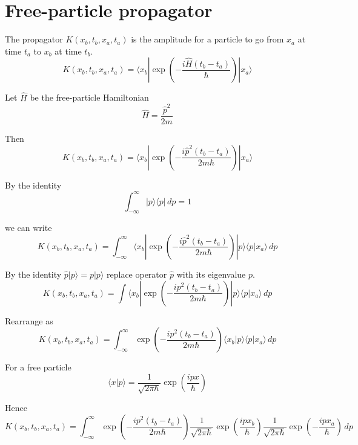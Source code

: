 

\section*{Free-particle propagator}

The propagator $K(x_b,t_b,x_a,t_a)$ is the amplitude for a particle to go from $x_a$
at time $t_a$ to $x_b$ at time $t_b$.
\begin{equation*}
K(x_b,t_b,x_a,t_a)=\langle x_b|\exp\left(-\frac{i\hat H(t_b-t_a)}{\hbar}\right)|x_a\rangle
\end{equation*}

Let $\hat H$ be the free-particle Hamiltonian
\begin{equation*}
\hat H=\frac{\hat p^2}{2m}
\end{equation*}

Then
\begin{equation*}
K(x_b,t_b,x_a,t_a)=\langle x_b|\exp\left(-\frac{i\hat p^2(t_b-t_a)}{2m\hbar}\right)|x_a\rangle
\end{equation*}

By the identity
\begin{equation*}
\int_{-\infty}^\infty|p\rangle\langle p|\,dp=1
\end{equation*}

we can write
\begin{equation*}
K(x_b,t_b,x_a,t_a)=\int_{-\infty}^\infty
\langle x_b|\exp\left(-\frac{i\hat p^2(t_b-t_a)}{2m\hbar}\right)|p\rangle\langle p|x_a\rangle\,dp
\end{equation*}

By the identity $\hat p|p\rangle=p|p\rangle$ replace operator $\hat p$ with its eigenvalue $p$.
\begin{equation*}
K(x_b,t_b,x_a,t_a)=\int\langle x_b|\exp\left(-\frac{ip^2(t_b-t_a)}{2m\hbar}\right)|p\rangle\langle p|x_a\rangle\,dp
\end{equation*}

Rearrange as
\begin{equation*}
K(x_b,t_b,x_a,t_a)=\int_{-\infty}^\infty
\exp\left(-\frac{ip^2(t_b-t_a)}{2m\hbar}\right)\langle x_b|p\rangle\langle p|x_a\rangle\,dp
\end{equation*}

For a free particle
\begin{equation*}
\langle x|p\rangle=\frac{1}{\sqrt{2\pi\hbar}}\exp\left(\frac{ipx}{\hbar}\right)
\end{equation*}

Hence
\begin{equation*}
K(x_b,t_b,x_a,t_a)=\int_{-\infty}^\infty
\exp\left(-\frac{ip^2(t_b-t_a)}{2m\hbar}\right)
\frac{1}{\sqrt{2\pi\hbar}}\exp\left(\frac{ipx_b}{\hbar}\right)
\frac{1}{\sqrt{2\pi\hbar}}\exp\left(-\frac{ipx_a}{\hbar}\right)\,dp
\end{equation*}

